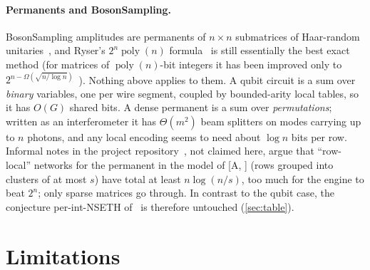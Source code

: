 \documentclass[10pt]{amsart}
\theoremstyle{plain}
\theoremstyle{definition}
\theoremstyle{remark}
\numberwithin{equation}{section}
\newcommand{\poly}{\operatorname{poly}}
\newcommand{\A}[1][]{\textup{[A\if\relax\detokenize{#1}\relax\else, #1\fi]}}
\begin{document}
\paragraph{Permanents and BosonSampling.} BosonSampling amplitudes are permanents of $n\times n$
submatrices of Haar-random unitaries~\cite{AaronsonArkhipov13}, and Ryser's $2^n\poly(n)$
formula~\cite{Ryser63} is still essentially the best exact method (for matrices of $\poly(n)$-bit
integers it has been improved only to $2^{n-\Omega(\sqrt{n/\log n})}$~\cite{Bjorklund16}). Nothing
above applies to them. A qubit circuit is a sum over \emph{binary} variables, one per wire segment,
coupled by bounded-arity local tables, so it has $O(G)$ shared bits. A dense permanent is a sum over
\emph{permutations}; written as an interferometer it has $\Theta(m^2)$ beam splitters on modes carrying
up to $n$ photons, and any local encoding seems to need about $\log n$ bits per row. Informal notes in
the project repository~\cite{TulsyanRepo26}, not claimed here, argue that ``row-local'' networks for
the permanent in the model of \A{} (rows grouped into clusters of at most $s$) have total at least
$n\log(n/s)$, too much for the engine to beat $2^n$; only sparse matrices go through. In contrast to
the qubit case, the conjecture per-int-NSETH of~\cite{DHKL20} is therefore untouched
(\cref{sec:table}).
\section{Limitations}\label{sec:limitations}
\end{document}
